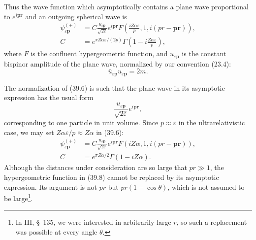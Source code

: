 Thus the wave function which asymptotically contains a plane wave proportional to $e^{i\mathbf p\mathbf r}$ and an outgoing spherical wave is
\begin{equation}
\begin{aligned}
\psi_{\varepsilon\mathbf p}^{(+)}
&=C\frac{u_{\varepsilon\mathbf p}}{\sqrt{2\varepsilon}}
e^{i\mathbf p\mathbf r}F\left(\frac{iZ\alpha\varepsilon}{p},1,
i(pr-\mathbf p\mathbf r)\right),\\
C&=e^{\pi Z\alpha\varepsilon/(2p)}
\Gamma\left(1-i\frac{Z\alpha\varepsilon}{p}\right),
\end{aligned}
\tag{39.6}
\end{equation}
where $F$ is the confluent hypergeometric function, and $u_{\varepsilon\mathbf p}$ is the constant bispinor amplitude of the plane wave, normalized by our convention (23.4):
\begin{equation}
\bar u_{\varepsilon\mathbf p}u_{\varepsilon\mathbf p}=2m.
\tag{39.7}
\end{equation}

The normalization of (39.6) is such that the plane wave in its asymptotic expression has the usual form
\[
\frac{u_{\varepsilon\mathbf p}}{\sqrt{2\varepsilon}}e^{i\mathbf p\mathbf r},
\]
corresponding to one particle in unit volume. Since $p\approx\varepsilon$ in the ultrarelativistic case, we may set $Z\alpha\varepsilon/p\approx Z\alpha$ in (39.6):
\begin{equation}
\begin{aligned}
\psi_{\varepsilon\mathbf p}^{(+)}
&=C\frac{u_{\varepsilon\mathbf p}}{\sqrt{2\varepsilon}}
e^{i\mathbf p\mathbf r}F(iZ\alpha,1,i(pr-\mathbf p\mathbf r)),\\
C&=e^{\pi Z\alpha/2}\Gamma(1-iZ\alpha).
\end{aligned}
\tag{39.8}
\end{equation}
Although the distances under consideration are so large that $pr\gg1$, the hypergeometric function in (39.8) cannot be replaced by its asymptotic expression. Its argument is not $pr$ but $pr(1-\cos\theta)$, which is not assumed to be large\footnote{In III, \S~135, we were interested in arbitrarily large $r$, so such a replacement was possible at every angle $\theta$.}.

